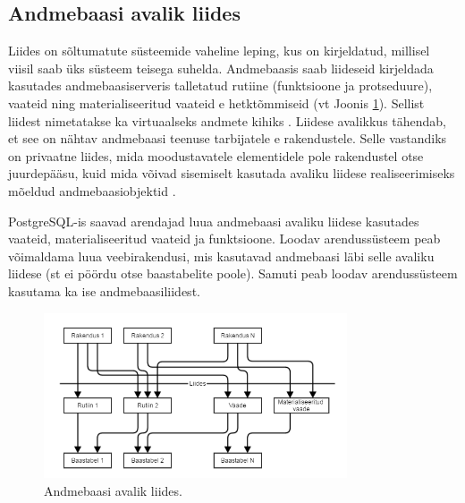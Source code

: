 \documentclass[a4paper,12pt]{article} %
\begin{document}
\subsection{Andmebaasi avalik liides}
\label{andmebaasi_avalik_liides}
Liides on sõltumatute süsteemide vaheline leping, kus on kirjeldatud, millisel viisil saab üks süsteem teisega suhelda.
Andmebaasis saab liideseid kirjeldada kasutades andmebaasiserveris talletatud rutiine (funktsioone ja protseduure), vaateid ning materialiseeritud vaateid e hetktõmmiseid (vt Joonis \ref{fig_andmebaasi_avalik_liides}).
Sellist liidest nimetatakse ka virtuaalseks andmete kihiks \cite[lk 108]{BuildingTheAgileDatabase}. Liidese avalikkus tähendab, et see on nähtav andmebaasi teenuse tarbijatele e rakendustele. Selle vastandiks on privaatne liides, mida moodustavatele elementidele pole rakendustel otse juurdepääsu, kuid mida võivad sisemiselt kasutada avaliku liidese realiseerimiseks mõeldud andmebaasiobjektid \cite{privateInterface}.
\par
PostgreSQL-is saavad arendajad luua andmebaasi avaliku liidese kasutades vaateid, materialiseeritud vaateid ja funktsioone. Loodav arendussüsteem peab võimaldama luua veebirakendusi, mis kasutavad andmebaasi läbi selle avaliku liidese (st ei pöördu otse baastabelite poole). Samuti peab loodav arendussüsteem kasutama ka ise andmebaasiliidest.
\begin{figure}[H]
\centering
\includegraphics[width=0.8\textwidth]{./diagrams/db-interface.png}
\caption{Andmebaasi avalik liides.}
\label{fig_andmebaasi_avalik_liides}
\end{figure}
\end{document}
